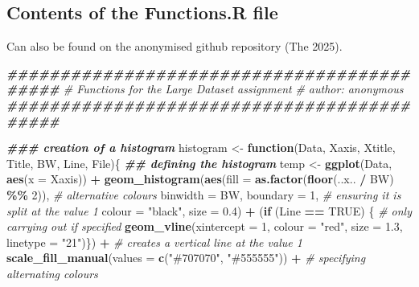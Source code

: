 \documentclass[
]{article}
\newenvironment{Shaded}{\begin{snugshade}}{\end{snugshade}}
\newcommand{\AttributeTok}[1]{\textcolor[rgb]{0.13,0.29,0.53}{#1}}
\newcommand{\CommentTok}[1]{\textcolor[rgb]{0.56,0.35,0.01}{\textit{#1}}}
\newcommand{\ConstantTok}[1]{\textcolor[rgb]{0.56,0.35,0.01}{#1}}
\newcommand{\ControlFlowTok}[1]{\textcolor[rgb]{0.13,0.29,0.53}{\textbf{#1}}}
\newcommand{\DecValTok}[1]{\textcolor[rgb]{0.00,0.00,0.81}{#1}}
\newcommand{\DocumentationTok}[1]{\textcolor[rgb]{0.56,0.35,0.01}{\textbf{\textit{#1}}}}
\newcommand{\FloatTok}[1]{\textcolor[rgb]{0.00,0.00,0.81}{#1}}
\newcommand{\FunctionTok}[1]{\textcolor[rgb]{0.13,0.29,0.53}{\textbf{#1}}}
\newcommand{\NormalTok}[1]{#1}
\newcommand{\OtherTok}[1]{\textcolor[rgb]{0.56,0.35,0.01}{#1}}
\newcommand{\SpecialCharTok}[1]{\textcolor[rgb]{0.81,0.36,0.00}{\textbf{#1}}}
\newcommand{\StringTok}[1]{\textcolor[rgb]{0.31,0.60,0.02}{#1}}
\begin{document}
\subsection{Contents of the Functions.R
file}\label{contents-of-the-functions.r-file}

Can also be found on the anonymised github repository (The 2025).

\begin{Shaded}
\begin{Highlighting}[]
\DocumentationTok{\#\#\#\#\#\#\#\#\#\#\#\#\#\#\#\#\#\#\#\#\#\#\#\#\#\#\#\#\#\#\#\#\#\#\#\#\#\#\#\#\#\#\#}
\CommentTok{\# Functions for the Large Dataset assignment}
\CommentTok{\# author: anonymous}
\DocumentationTok{\#\#\#\#\#\#\#\#\#\#\#\#\#\#\#\#\#\#\#\#\#\#\#\#\#\#\#\#\#\#\#\#\#\#\#\#\#\#\#\#\#\#\#}

\DocumentationTok{\#\#\# creation of a histogram}
\NormalTok{histogram }\OtherTok{\textless{}{-}} \ControlFlowTok{function}\NormalTok{(Data, Xaxis, Xtitle, Title, BW, Line, File)\{}
  \DocumentationTok{\#\# defining the histogram}
\NormalTok{  temp }\OtherTok{\textless{}{-}} \FunctionTok{ggplot}\NormalTok{(Data, }\FunctionTok{aes}\NormalTok{(}\AttributeTok{x =}\NormalTok{ Xaxis)) }\SpecialCharTok{+}
    \FunctionTok{geom\_histogram}\NormalTok{(}\FunctionTok{aes}\NormalTok{(}\AttributeTok{fill =} \FunctionTok{as.factor}\NormalTok{(}\FunctionTok{floor}\NormalTok{(..x.. }\SpecialCharTok{/}\NormalTok{ BW) }\SpecialCharTok{\%\%} \DecValTok{2}\NormalTok{)), }\CommentTok{\# alternative colours}
                   \AttributeTok{binwidth =}\NormalTok{ BW, }\AttributeTok{boundary =} \DecValTok{1}\NormalTok{, }\CommentTok{\# ensuring it is split at the value 1}
                   \AttributeTok{colour =} \StringTok{"black"}\NormalTok{, }\AttributeTok{size =} \FloatTok{0.4}\NormalTok{) }\SpecialCharTok{+}
\NormalTok{    (}\ControlFlowTok{if}\NormalTok{ (Line }\SpecialCharTok{==} \ConstantTok{TRUE}\NormalTok{) \{ }\CommentTok{\# only carrying out if specified}
      \FunctionTok{geom\_vline}\NormalTok{(}\AttributeTok{xintercept =} \DecValTok{1}\NormalTok{, }\AttributeTok{colour =} \StringTok{"red"}\NormalTok{, }
                 \AttributeTok{size =} \FloatTok{1.3}\NormalTok{, }\AttributeTok{linetype =} \StringTok{"21"}\NormalTok{)\}) }\SpecialCharTok{+} \CommentTok{\# creates a vertical line at the value 1}
    \FunctionTok{scale\_fill\_manual}\NormalTok{(}\AttributeTok{values =} \FunctionTok{c}\NormalTok{(}\StringTok{"\#707070"}\NormalTok{, }\StringTok{"\#555555"}\NormalTok{)) }\SpecialCharTok{+} \CommentTok{\# specifying alternating colours}

\end{Highlighting}
\end{Shaded}
\end{document}
